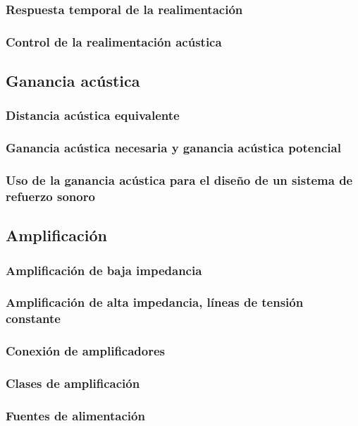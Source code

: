 \documentclass[a4paper, 8pt]{extarticle}
\begin{document}
\begin{multicols}{3}
  \subsubsection{Respuesta temporal de la realimentación}
  \subsubsection{Control de la realimentación acústica}

  \subsection{Ganancia acústica}
  \subsubsection{Distancia acústica equivalente}
  \subsubsection{Ganancia acústica necesaria y ganancia acústica potencial}
  \subsubsection{Uso de la ganancia acústica para el diseño de un sistema de refuerzo sonoro}
  \subsection{Amplificación}
  \subsubsection{Amplificación de baja impedancia}
  \subsubsection{Amplificación de alta impedancia, líneas de tensión constante}
  \subsubsection{Conexión de amplificadores}
  \subsubsection{Clases de amplificación}
  \subsubsection{Fuentes de alimentación}

\end{multicols}
\end{document}
